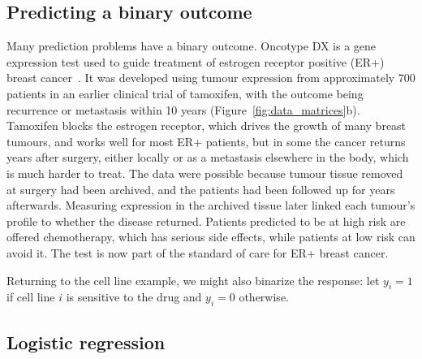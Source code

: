 \subsection{Predicting a binary outcome}

Many prediction problems have a binary outcome. Oncotype DX is a gene expression test used to guide treatment of estrogen receptor positive (ER+) breast cancer~\citep{paik2004}. It was developed using tumour expression from approximately 700 patients in an earlier clinical trial of tamoxifen, with the outcome being recurrence or metastasis within 10 years (Figure~\ref{fig:data_matrices}b). Tamoxifen blocks the estrogen receptor, which drives the growth of many breast tumours, and works well for most ER+ patients, but in some the cancer returns years after surgery, either locally or as a metastasis elsewhere in the body, which is much harder to treat. The data were possible because tumour tissue removed at surgery had been archived, and the patients had been followed up for years afterwards. Measuring expression in the archived tissue later linked each tumour's profile to whether the disease returned. Patients predicted to be at high risk are offered chemotherapy, which has serious side effects, while patients at low risk can avoid it. The test is now part of the standard of care for ER+ breast cancer.

Returning to the cell line example, we might also binarize the response: let $y_i=1$ if cell line $i$ is sensitive to the drug and $y_i=0$ otherwise.

\subsection{Logistic regression}

